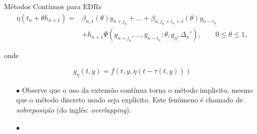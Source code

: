 \documentclass{beamer}
\theoremstyle{plain}
\theoremstyle{definition}
\begin{document}
\begin{frame}{Métodos Contínuos para EDRs}
    \begin{equation}
        \begin{split}
            \eta(t_n + \theta h_{n+1}) = &\beta_{n, 1} (\theta) y_{n + j_n} + \dots + \beta_{n, j_n + i_n + 1}(\theta) y_{n - i_n} \\
                                         &+ h_{n+1} \Psi(y_{n+j_n}, \dots, y_{n-i_n}; \theta, g_\eta, \Delta _n '), \qquad 0 \leq \theta \leq 1,
                                         \label{chap3:sec:2:def:eq:Interpolant_extension}
        \end{split}
    \end{equation}


    onde

    $$
    g_{\eta}(t, y)=f(t, y, \eta(t-\tau(t, y)))
    $$

    \begin{itemize}
        \item[$\bullet$] Observe que o uso da extensão contínua torna o método implicito, mesmo que o método discreto usado seja explicito. Este fenômeno é chamado de \textit{sobreposição} (do inglês: \textit{overlapping}).

        \item[$\bullet$] 
    \end{itemize}

\end{frame}


\end{document}
